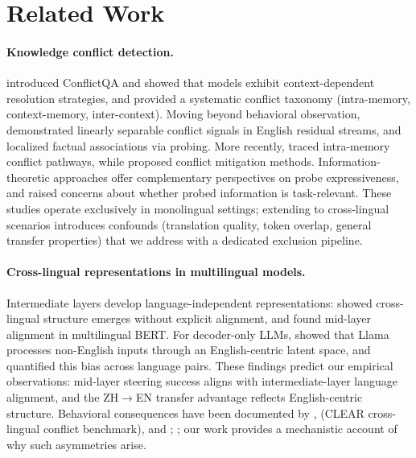 \section{Related Work}
\label{sec:related_work}

\paragraph{Knowledge conflict detection.}
\citet{xie2024adaptive} introduced ConflictQA and showed that models exhibit context-dependent resolution strategies, and \citet{xu2024knowledge} provided a systematic conflict taxonomy (intra-memory, context-memory, inter-context).
Moving beyond behavioral observation, \citet{zhao2024analysing} demonstrated linearly separable conflict signals in English residual streams, and \citet{brink2026probing} localized factual associations via probing. More recently, \citet{pham2026where} traced intra-memory conflict pathways, while \citet{li2025taming} proposed conflict mitigation methods.
Information-theoretic approaches \citep{pimentel2021probing} offer complementary perspectives on probe expressiveness, and \citet{ravichander2021probing} raised concerns about whether probed information is task-relevant.
These studies operate exclusively in monolingual settings; extending to cross-lingual scenarios introduces confounds (translation quality, token overlap, general transfer properties) that we address with a dedicated exclusion pipeline.

\paragraph{Cross-lingual representations in multilingual models.}
Intermediate layers develop language-independent representations: \citet{wu2020emerging} showed cross-lingual structure emerges without explicit alignment, and \citet{muller2021first} found mid-layer alignment in multilingual BERT.
For decoder-only LLMs, \citet{wendler2024llamas} showed that Llama processes non-English inputs through an English-centric latent space, and \citet{kargaran2024mexa} quantified this bias across language pairs.
These findings predict our empirical observations: mid-layer steering success aligns with intermediate-layer language alignment, and the ZH$\to$EN transfer advantage reflects English-centric structure.
Behavioral consequences have been documented by \citet{wang2025lost}, \citet{zhao2026when} (CLEAR cross-lingual conflict benchmark), and \citet{ifergan2024beneath}; \citet{xing2024evaluating}; our work provides a mechanistic account of why such asymmetries arise.


